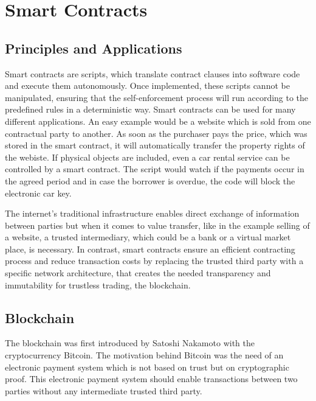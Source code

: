 \documentclass[conference]{IEEEtran}
\begin{document}
\section{Smart Contracts}
\subsection{Principles and Applications}

Smart contracts are scripts, which translate contract clauses into software code and execute them autonomously. Once implemented, these scripts cannot be manipulated, ensuring that the self-enforcement process will run according to the predefined rules in a deterministic way.   
Smart contracts can be used for many different applications. An easy example would be a website which is sold from one contractual party to another. As soon as the purchaser pays the price, which was stored in the smart contract, it will automatically transfer the property rights of the webiste. If physical objects are included, even a car rental service can be controlled by a smart contract. The script would watch if the payments occur in the agreed period and in case the borrower is overdue, the code will block the electronic car key. \cite{Meitinger2017} \cite{Spancken2016} \cite{Jung2017} \cite{Lee2016}\par 
The internet's traditional infrastructure enables direct exchange of information between parties but when it comes to value transfer, like in the example selling of a website, a trusted intermediary, which could be a bank or a virtual market place, is necessary. In contrast, smart contracts ensure an efficient contracting process and reduce transaction costs by replacing the trusted third party with a specific network architecture, that creates the needed transparency and immutability for trustless trading, the blockchain. \cite{Meitinger2017}
\subsection{Blockchain}
The blockchain was first introduced by Satoshi Nakamoto with the cryptocurrency Bitcoin. The motivation behind Bitcoin was the need of an electronic payment system which is not based on trust but on cryptographic proof. This electronic payment system should enable transactions between two parties without any intermediate trusted third party. \cite{Nakamoto2008}
\end{document}
